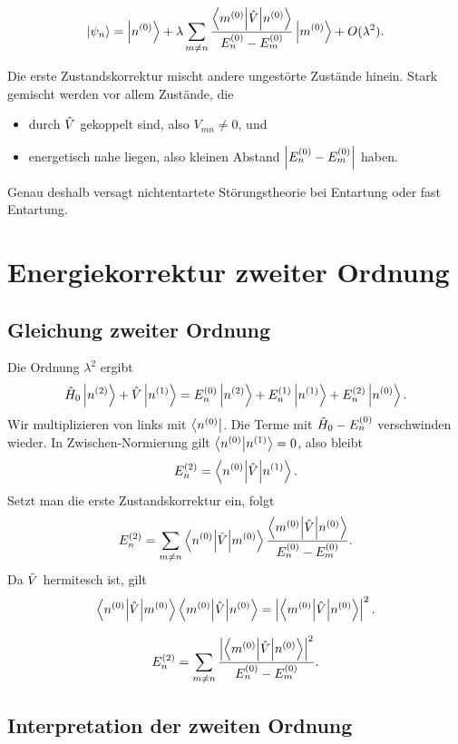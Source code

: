 \begin{formulabox}
\[
    \left|\psi_n\right\rangle
    =\left|n^{(0)}\right\rangle
    +\lambda\sum_{m\neq n}
    \frac{\left\langle m^{(0)}\middle|\hat V\middle|n^{(0)}\right\rangle}{E_n^{(0)}-E_m^{(0)}}
    \left|m^{(0)}\right\rangle
    +O(\lambda^2).
\]
\end{formulabox}

\begin{examtipbox}
Die erste Zustandskorrektur mischt andere ungestörte Zustände hinein. Stark gemischt werden vor allem Zustände, die
\begin{itemize}
    \item durch \(\hat V\) gekoppelt sind, also \(V_{mn}\neq 0\), und
    \item energetisch nahe liegen, also kleinen Abstand \(\left| E_n^{(0)}-E_m^{(0)} \right|\) haben.
\end{itemize}
Genau deshalb versagt nichtentartete Störungstheorie bei Entartung oder fast Entartung.
\end{examtipbox}

\section{Energiekorrektur zweiter Ordnung}

\subsection{Gleichung zweiter Ordnung}

Die Ordnung \(\lambda^2\) ergibt
\[
    \hat H_0\left|n^{(2)}\right\rangle+\hat V\left|n^{(1)}\right\rangle
    =E_n^{(0)}\left|n^{(2)}\right\rangle+E_n^{(1)}\left|n^{(1)}\right\rangle+E_n^{(2)}\left|n^{(0)}\right\rangle.
\]
Wir multiplizieren von links mit \(\left\langle n^{(0)}\right|\). Die Terme mit \(\hat H_0-E_n^{(0)}\) verschwinden wieder. In Zwischen-Normierung gilt \(\left\langle n^{(0)}\middle|n^{(1)}\right\rangle=0\), also bleibt
\[
    E_n^{(2)}=\left\langle n^{(0)}\middle|\hat V\middle|n^{(1)}\right\rangle.
\]
Setzt man die erste Zustandskorrektur ein, folgt
\[
    E_n^{(2)}
    =\sum_{m\neq n}
    \left\langle n^{(0)}\middle|\hat V\middle|m^{(0)}\right\rangle
    \frac{\left\langle m^{(0)}\middle|\hat V\middle|n^{(0)}\right\rangle}{E_n^{(0)}-E_m^{(0)}}.
\]
Da \(\hat V\) hermitesch ist, gilt
\[
    \left\langle n^{(0)}\middle|\hat V\middle|m^{(0)}\right\rangle
    \left\langle m^{(0)}\middle|\hat V\middle|n^{(0)}\right\rangle
    =\left| \left\langle m^{(0)}\middle|\hat V\middle|n^{(0)}\right\rangle \right|^2.
\]

\begin{formulabox}
\[
    E_n^{(2)}
    =\sum_{m\neq n}
    \frac{\left| \left\langle m^{(0)}\middle|\hat V\middle|n^{(0)}\right\rangle \right|^2}{E_n^{(0)}-E_m^{(0)}}.
\]
\end{formulabox}

\subsection{Interpretation der zweiten Ordnung}

